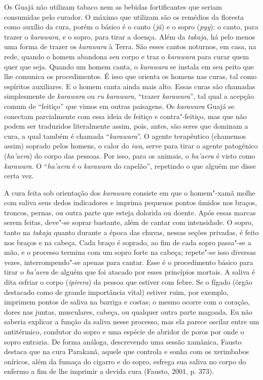 Os Guajá não utilizam tabaco nem as bebidas fortificantes que seriam
consumidas pelo curador. O máximo que utilizam são os remédios da
floresta como auxílio da cura, porém o básico é o canto (\emph{jã}) e o
sopro (\emph{pyy}): o canto, para trazer o \emph{karawara}, e o sopro,
para tirar a doença. Além da \emph{takaja}, há pelo menos uma forma de
trazer os \emph{karawara} à Terra. São esses cantos noturnos, em casa,
na rede, quando o homem abandona seu corpo e traz o \emph{karawara} para
curar quem quer que seja. Quando um homem canta, o \emph{karawara} se
instala em seu peito que lhe comunica os procedimentos. É isso que
orienta os homens nas curas, tal como espíritos auxiliares. E o homem
canta ainda mais alto. Essas curas são chamadas simplesmente de
\emph{karawara} ou \emph{ru} \emph{karawara}, ``trazer \emph{karawara}'',
tal qual a acepção comum de ``feitiço'' que vimos em outras paisagens. Os
\emph{karawara} Guajá se conectam parcialmente com essa ideia de feitiço
e contra"-feitiço, mas que não podem ser traduzidos literalmente assim,
pois, antes, são seres que dominam a cura, a qual também é chamada
``\emph{karawara}''. O agente terapêutico (chamemos assim) soprado pelos
homens, o calor do \emph{iwa}, serve para tirar o agente patogênico
(\emph{ha'aera}) do corpo das pessoas. Por isso, para os animais, o
\emph{ha'aera} é visto como \emph{karawara}. O ``\emph{ha'aera} é o
\emph{karawara} do capelão'', repetindo o que alguém me disse certa vez.

A cura feita sob orientação dos \emph{karawara} consiste em que o
homem"-xamã molhe com saliva seus dedos indicadores e imprima pequenos
pontos úmidos nos braços, troncos, pernas, ou outra parte que esteja
dolorida ou doente. Após essas marcas serem feitas, deve"-se soprar
bastante, além de cantar com intensidade. O sopro, tanto na
\emph{takaja} quanto durante a época das chuvas, nessas seções privadas,
é feito nos braços e na cabeça. Cada braço é soprado, ao fim de cada
sopro passa"-se a mão, e o processo termina com um sopro forte na cabeça;
repete"-se isso diversas vezes, interrompendo"-se apenas para cantar. Esse
é o procedimento básico para tirar o \emph{ha'aera} de alguém que foi
atacado por esses princípios mortais. A saliva é dita esfriar o corpo
(\emph{ipirera}) da pessoa que estiver com febre. Se o fígado (órgão
destacado como de grande importância vital) estiver ruim, por exemplo,
imprimem pontos de saliva na barriga e costas; o mesmo ocorre com o
coração, dores nas juntas, musculares, cabeça, ou qualquer outra parte
magoada. Eu não saberia explicar a função da saliva nesse processo, mas
ela parece oscilar entre um antitérmico, condutor do sopro e uma espécie
de abridor de poros por onde o sopro entraria. De forma análoga,
descrevendo uma sessão xamânica, Fausto destaca que na cura Parakanã,
aquele que controla e sonha com os xerimbabos oníricos, além da fumaça
do cigarro e do sopro, esfrega sua saliva no corpo do enfermo a fim de
lhe imprimir a devida cura (Fausto, 2001, p. 373).

